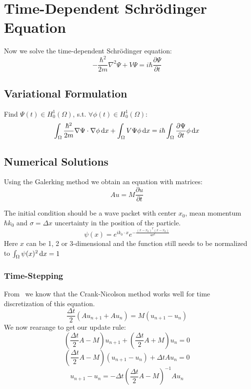 \documentclass[a4paper,11pt]{scrartcl}
\newcommand*{\dx}{\dif{}x}
\newcommand*{\Dt}{\Delta{}t}
\begin{document}
\section{Time-Dependent Schrödinger Equation}
Now we solve the time-dependent Schrödinger equation:
\[ -\frac{\hbar^2}{2m} \nabla^2 \Psi + V \Psi = i \hbar \frac{\partial\Psi}{\partial{}t}\]

\subsection{Variational Formulation}

Find $\Psi(t) \in H^1_0(\Omega)$, s.t. $\forall \phi(t) \in H^1_0(\Omega)$:
\[ \int_{\Omega} \frac{\hbar^2}{2m} \nabla \Psi \cdot \nabla\phi \dx +
  \int_{\Omega} V \Psi \phi\dx = i \hbar\int_{\Omega}
  \frac{\partial\Psi}{\partial{}t} \phi\dx\]

\subsection{Numerical Solutions}
Using the Galerking method we obtain an equation with matrices:
\[A u = M \frac{\partial{}u}{\partial{}t}\]

The initial condition should be a wave packet with center $x_0$, mean momentum
$\hbar k_0$ and $\sigma = \Delta x$ uncertainty in the position of the particle.
\[\psi(x) =  e^{ik_0\cdot x}e^{-\frac{(x-x_0)^T(x-x_0)}{4\sigma^2}}\]
Here $x$ can be 1, 2 or 3-dimensional and the function still needs to be
normalized to $\int_{\Omega}\psi(x)^2\dx = 1$

\subsubsection{Time-Stepping}
From~\cite{Sehra07} we know that the Crank-Nicolson method works well for time
discretization of this equation.
\[ \frac{\Dt}{2} (A u_{n+1} + A u_{n}) = M (u_{n+1} - u_n) \]
We now rearange to get our update rule:
\[ \left( \frac{\Dt}{2}A - M \right) u_{n+1} + \left( \frac{\Dt}{2} A + M \right) u_n = 0\]
\[ \left( \frac{\Dt}{2}A - M \right) (u_{n+1} - u_n) + \Dt A u_n = 0\]
\[ u_{n+1} - u_n = - \Dt \left( \frac{\Dt}{2}A - M \right)^{-1} A u_n\]

{}

\end{document}
